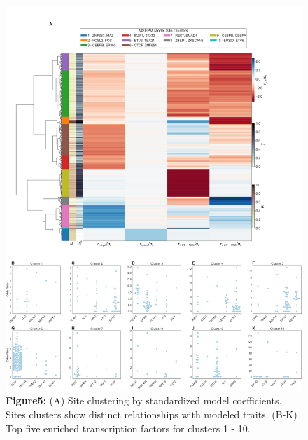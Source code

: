 \documentclass{article}
\begin{document}
{\begin{center}
    \begin{figure}
    \includegraphics[scale=.15]{Figures/Figure5.png}
    \footnotesize
    \caption*{\small \textbf{Figure5: } (A) Site clustering by standardized model coefficients. Sites clusters show 
    distinct relationships with modeled traits. (B-K) Top five enriched transcription factors for clusters 1 - 10. 
    }
    \end{figure}
\end{center}

}
\end{document}
